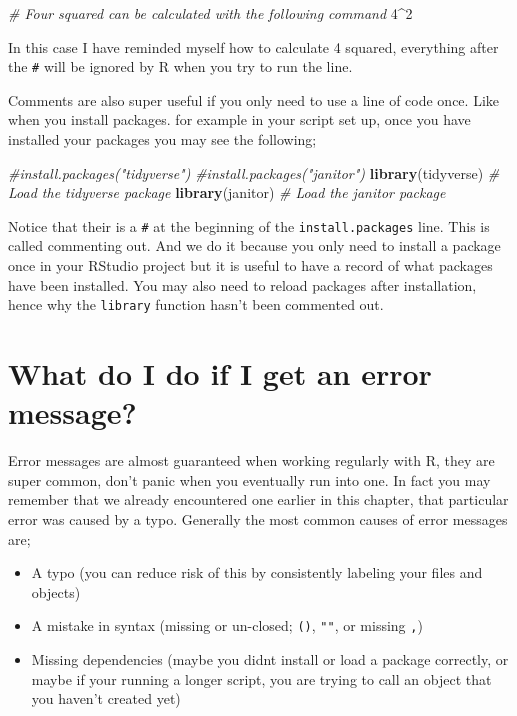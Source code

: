 \documentclass[
]{book}
\newenvironment{Shaded}{\begin{snugshade}}{\end{snugshade}}
\newcommand{\CommentTok}[1]{\textcolor[rgb]{0.56,0.35,0.01}{\textit{#1}}}
\newcommand{\DecValTok}[1]{\textcolor[rgb]{0.00,0.00,0.81}{#1}}
\newcommand{\FunctionTok}[1]{\textcolor[rgb]{0.13,0.29,0.53}{\textbf{#1}}}
\newcommand{\NormalTok}[1]{#1}
\newcommand{\SpecialCharTok}[1]{\textcolor[rgb]{0.81,0.36,0.00}{\textbf{#1}}}
\providecommand{\tightlist}{%
  \setlength{\itemsep}{0pt}\setlength{\parskip}{0pt}}
\begin{document}
\begin{Shaded}
\begin{Highlighting}[]
\CommentTok{\# Four squared can be calculated with the following command}
\DecValTok{4}\SpecialCharTok{\^{}}\DecValTok{2}
\end{Highlighting}
\end{Shaded}

In this case I have reminded myself how to calculate 4 squared, everything after the \texttt{\#} will be ignored by R when you try to run the line.

Comments are also super useful if you only need to use a line of code once. Like when you install packages. for example in your script set up, once you have installed your packages you may see the following;

\begin{Shaded}
\begin{Highlighting}[]
\CommentTok{\#install.packages("tidyverse")}
\CommentTok{\#install.packages("janitor")}
\FunctionTok{library}\NormalTok{(tidyverse) }\CommentTok{\# Load the tidyverse package}
\FunctionTok{library}\NormalTok{(janitor) }\CommentTok{\# Load the janitor package}
\end{Highlighting}
\end{Shaded}

Notice that their is a \texttt{\#} at the beginning of the \texttt{install.packages} line. This is called commenting out. And we do it because you only need to install a package once in your RStudio project but it is useful to have a record of what packages have been installed. You may also need to reload packages after installation, hence why the \texttt{library} function hasn't been commented out.

\hypertarget{what-do-i-do-if-i-get-an-error-message}{%
\section{What do I do if I get an error message?}\label{what-do-i-do-if-i-get-an-error-message}}

Error messages are almost guaranteed when working regularly with R, they are super common, don't panic when you eventually run into one. In fact you may remember that we already encountered one earlier in this chapter, that particular error was caused by a typo. Generally the most common causes of error messages are;

\begin{itemize}
\tightlist
\item
  A typo (you can reduce risk of this by consistently labeling your files and objects)
\item
  A mistake in syntax (missing or un-closed; \texttt{()}, \texttt{""}, or missing \texttt{,})
\item
  Missing dependencies (maybe you didnt install or load a package correctly, or maybe if your running a longer script, you are trying to call an object that you haven't created yet)
\end{itemize}
\end{document}
